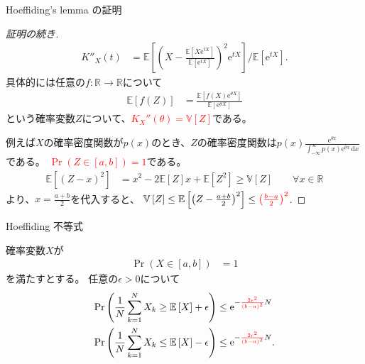 \documentclass[lualatex,handout]{beamer}
\newcommand{\emm}[1]{\textcolor{red}{#1}}
\newcommand{\expt}[1]{\mathbb{E}\left[#1\right]}
\newcommand{\var}[1]{\mathbb{V}\left[#1\right]}
\newcommand\dx{{\,\mathrm{d}x}}
\theoremstyle{definition}
\begin{document}
\begin{frame}{Hoeffiding's lemma の証明}
\small
\begin{proof}[証明の続き]
\begin{align*}
K''_X(t) 
&= {\expt{\left(X-\frac{\expt{X\mathrm{e}^{tX}}}{\expt{\mathrm{e}^{tX}}}\right)^2\mathrm{e}^{tX}}}/{\expt{\mathrm{e}^{tX}}}.
\end{align*}
具体的には任意の$f\colon\mathbb{R}\to\mathbb{R}$について
\begin{align*}
\expt{f(Z)} &= \frac{\expt{f(X)\mathrm{e}^{\theta X}}}{\expt{\mathrm{e}^{\theta X}}}
\end{align*}
という確率変数$Z$について、\emm{$K_X''(\theta) = \var{Z}$}である。

例えば$X$の確率密度関数が$p(x)$のとき、$Z$の確率密度関数は$p(x)\frac{\mathrm{e}^{\theta x}}{\int_{-\infty}^\infty p(x)\mathrm{e}^{\theta x}\dx}$である。
\emm{$\Pr(Z\in[a,b])=1$}である。
\begin{align*}
\expt{(Z-x)^2} &= x^2 - 2\expt{Z}x + \expt{Z^2}\ge \var{Z}\qquad\forall x\in\mathbb{R}
\end{align*}
より、$x=\frac{a+b}2$を代入すると、
$\var{Z} \le \expt{\left(Z-\frac{a+b}2\right)^2}\le \emm{\left(\frac{b-a}2\right)^2}$.
\end{proof}
\end{frame}

\begin{frame}{Hoeffiding 不等式}
\begin{theorem}
確率変数$X$が
\begin{align*}
\Pr(X\in[a,b])&=1
\end{align*}
を満たすとする。
任意の$\epsilon>0$について
\begin{align*}
\Pr\left(\frac1N\sum_{k=1}^N X_k \ge \expt{X} + \epsilon\right) &\le \mathrm{e}^{-\emm{\frac{2\epsilon^2}{(b-a)^2}}N}\\
\Pr\left(\frac1N\sum_{k=1}^N X_k \le \expt{X} - \epsilon\right) &\le \mathrm{e}^{-\emm{\frac{2\epsilon^2}{(b-a)^2}}N}.
\end{align*}
\end{theorem}
\end{frame}
\end{document}
